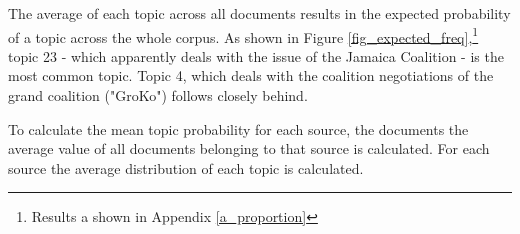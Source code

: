\documentclass[12pt,a4paper,notitlepage]{article}
\begin{document}
The average of each topic across all documents results in the expected probability of a topic across the whole corpus. As shown in Figure \ref{fig_expected_freq},\footnote{Results a shown in Appendix \ref{a_proportion}} topic 23 - which apparently deals with the issue of the Jamaica Coalition - is the most common topic. Topic 4, which deals with the coalition negotiations of the grand coalition ("GroKo") follows closely behind. 
%


To calculate the mean topic probability for each source, the documents the average value of all documents belonging to that source is calculated. 
For each source the average distribution of each topic is calculated. 
\end{document}
